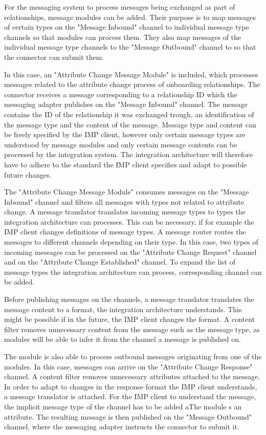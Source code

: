 For the messaging system to process messages being exchanged as part of relationships, message modules can be added. Their purpose is to map messages of certain types on the "Message Inbound" channel to individual message type channels so that modules can process them. They also map messages of the individual message type channels to the "Message Outbound" channel to so that the connector can submit them.

In this case, an "Attribute Change Message Module" is included, which processes messages related to the attribute change process of onboarding relationships. The connector receives a message corresponding to a relationship ID which the messaging adapter publishes on the "Message Inbound" channel. The message contains the ID of the relationship it was exchanged trough, an identification of the message type and the content of the message. Message type and content can be freely specified by the IMP client, however only certain message types are understood by message modules and only certain message contents can be processed by the integration system. The integration architecture will therefore have to adhere to the standard the IMP client specifies and adapt to possible future changes.

The "Attribute Change Message Module" consumes messages on the "Message Inbound" channel and filters all messages with types not related to attribute change. A message translator translates incoming message types to types the integration architecture can processes. This can be necessary, if for example the IMP client changes definitions of message types. A message router routes the messages to different channels depending on their type. In this case, two types of incoming messages can be processed on the "Attribute Change Request" channel and on the "Attribute Change Established" channel. To expand the list of message types the integration architecture can process, corresponding channel can be added.

Before publishing messages on the channels, a message translator translates the message content to a format, the integration architecture understands. This might be possible if in the future, the IMP client changes the format. A content filter removes unnecessary content from the message such as the message type, as modules will be able to infer it from the channel a message is published on.

The module is also able to process outbound messages originating from one of the modules. In this case, messages can arrive on the "Attribute Change Response" channel. A content filter removes unnecessary attributes attached to the message. In order to adapt to changes in the response format the IMP client understands, a message translator is attached. For the IMP client to understand the message, the implicit message type of the channel has to be added aThe module s an attribute. The resulting message is then published on the "Message Outbound" channel, where the messaging adapter instructs the connector to submit it.

